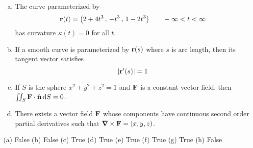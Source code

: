 \begin{question}[M317 2009A]
\begin{enumerate}[(a)]
\item
The curve parameterized by
\begin{equation*}
\mathbf{r}(t) = \big(2 + 4t^3 \,,\, -t^3 \,,\, 1 - 2t^3\big)\qquad
-\infty < t < \infty
\end{equation*}
has curvature $\kappa(t) = 0$ for all $t$.

\item
If a smooth curve is parameterized by $\mathbf{r}(s)$ where $s$ is arc length, 
then its tangent vector satisfies
\begin{equation*}
|\mathbf{r}'(s)| = 1
\end{equation*}

\item
If $S$ is the sphere $x^2 + y^2 + z^2 = 1$ and $\mathbf{F}$ is a constant 
vector field, then $\iint_S \mathbf{F} \cdot\hat{\mathbf{n}}\, \mathrm{d}S = 0$.

\item
There exists a vector field $\mathbf{F}$ whose components have continuous second 
order partial derivatives such that $\vnabla\times\vF = (x, y, z)$.

\end{enumerate}
\end{question}

%

\begin{answer} 
(a) False\qquad
(b) False\qquad
(c) True\qquad
(d) True\qquad
(e) True\qquad
(f) True\qquad
(g) True\qquad
(h) False
\end{answer}

